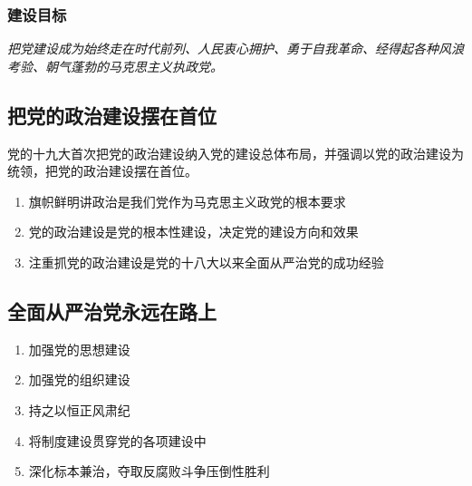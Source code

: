         \subsubsection{建设目标}
        \emph{把党建设成为始终走在时代前列、人民衷心拥护、勇于自我革命、经得起各种风浪考验、朝气蓬勃的马克思主义执政党。}

    \subsection{把党的政治建设摆在首位}
        党的十九大首次把党的政治建设纳入党的建设总体布局，并强调以党的政治建设为统领，把党的政治建设摆在首位。
        \begin{enumerate}
            \item 旗帜鲜明讲政治是我们党作为马克思主义政党的根本要求
            \item 党的政治建设是党的根本性建设，决定党的建设方向和效果
            \item 注重抓党的政治建设是党的十八大以来全面从严治党的成功经验
        \end{enumerate}

    \subsection{全面从严治党永远在路上}
        \begin{enumerate}
            \item 加强党的思想建设
            \item 加强党的组织建设
            \item 持之以恒正风肃纪
            \item 将制度建设贯穿党的各项建设中
            \item 深化标本兼治，夺取反腐败斗争压倒性胜利
        \end{enumerate}
